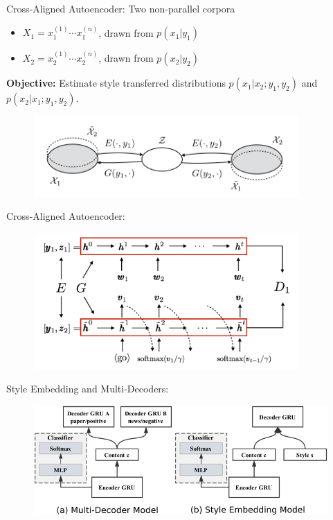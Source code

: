 \documentclass[aspectratio=169]{beamer}
\begin{document}
\begin{frame}{Cross-Aligned Autoencoder: \citet{shen2017style}}
	Two non-parallel corpora
	\begin{itemize}
		\item $X_1 = {x_1^{(1)} \cdots x_1^{(n)}}$, drawn from $p(x_1|y_1)$
		\item $X_2 = {x_2^{(1)} \cdots x_2^{(n)}}$, drawn from $p(x_2|y_2)$
	\end{itemize}

	\textbf{Objective:} Estimate style transferred distributions $p(x_1|x_2;y_1,y_2)$ and $p(x_2|x_1;y_1,y_2)$.

	\centering
	\begin{figure}[ht]
		\includegraphics[width=0.9\textwidth]{images/stca-architecture}
	\end{figure}
\end{frame}

\begin{frame}{Cross-Aligned Autoencoder: \citet{shen2017style}}
	\centering
	\begin{figure}[ht]
		\includegraphics[width=0.9\textwidth]{images/stca-cross-align}
	\end{figure}
\end{frame}

\begin{frame}{Style Embedding and Multi-Decoders: \citet{fu2017style}}
	\centering
	\begin{figure}[ht]
		\includegraphics[width=\textwidth]{images/semb-architecture}
	\end{figure}
\end{frame}
\end{document}
